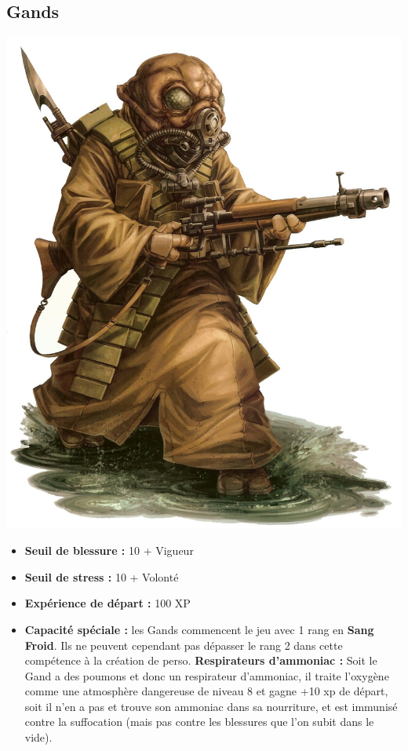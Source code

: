 \documentclass[twoside]{article}
\begin{document}
\subsection*{Gands}

\noindent\begin{minipage}{0.3\textwidth}
	\includegraphics[width=1\linewidth]{../_img/species/gand}
\end{minipage}%
\hfill%
\begin{minipage}{0.7\textwidth}\raggedleft
	\begin{itemize}
		\item \textbf{Seuil de blessure :} 10 + Vigueur 
		\item \textbf{Seuil de stress :} 10 + Volonté 
		\item \textbf{Expérience de départ :} 100 XP
		\item \textbf{Capacité spéciale :} les Gands commencent le jeu avec 1 rang en \textbf{Sang Froid}. Ils ne peuvent cependant pas dépasser le rang 2 dans cette compétence à la création de perso.\textbf{		Respirateurs d'ammoniac :} Soit le Gand a des poumons et donc un respirateur d'ammoniac, il traite l'oxygène comme une atmosphère dangereuse de niveau 8 et gagne +10 xp de départ, soit il n'en a pas et trouve son ammoniac dans sa nourriture, et est immunisé contre la suffocation (mais pas contre les blessures que l'on subit dans le vide).
	\end{itemize}
\end{minipage}
\end{document}
